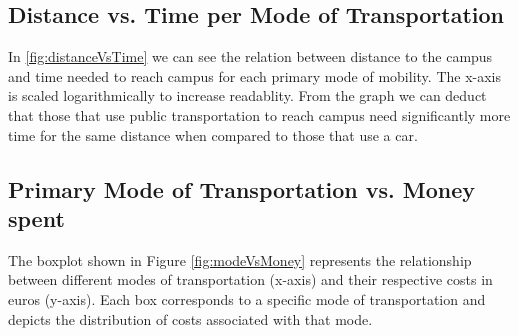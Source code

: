 \subsection{Distance vs. Time per Mode of Transportation}

In \ref{fig:distanceVsTime} we can see the relation between distance to the campus and time needed to reach campus for each primary mode of mobility. The x-axis is scaled logarithmically to increase readablity. From the graph we can deduct that those that use public transportation to reach campus need significantly more time for the same distance when compared to those that use a car.

\subsection{Primary Mode of Transportation vs. Money spent}

The boxplot shown in Figure \ref{fig:modeVsMoney} represents the relationship between different modes of transportation (x-axis) and their respective costs in euros (y-axis). Each box corresponds to a specific mode of transportation and depicts the distribution of costs associated with that mode.

